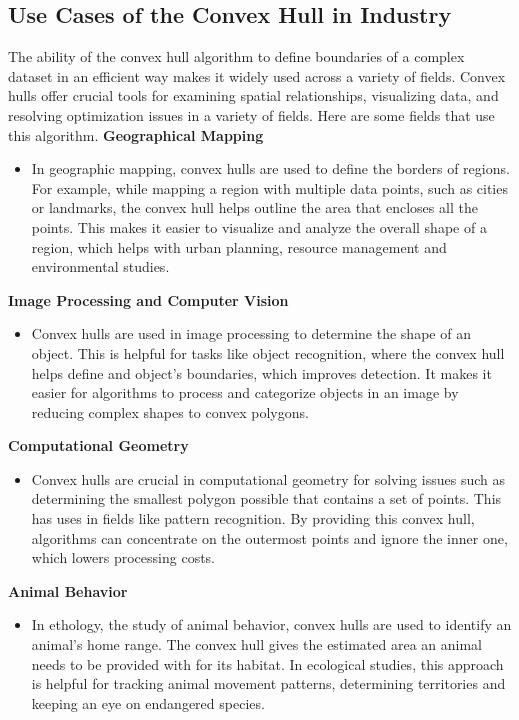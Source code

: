     \subsection{Use Cases of the Convex Hull in Industry}
    The ability of the convex hull algorithm to define boundaries of a complex dataset in an efficient way makes it widely used across a variety of fields. Convex hulls offer crucial tools for examining spatial relationships, visualizing data, and resolving optimization issues in a variety of fields. Here are some fields that use this algorithm. \newline \newline
    \textbf{Geographical Mapping}
    \begin{itemize}
        \item In geographic mapping, convex hulls are used to define the borders of regions. For example, while mapping a region with multiple data points, such as cities or landmarks, the convex hull helps outline the area that encloses all the points. This makes it easier to visualize and analyze the overall shape of a region, which helps with urban planning, resource management and environmental studies.
    \end{itemize}
    \textbf{Image Processing and Computer Vision}
    \begin{itemize}
        \item Convex hulls are used in image processing to determine the shape of an object. This is helpful for tasks like object recognition, where the convex hull helps define and object's boundaries, which improves detection. It makes it easier for algorithms to process and categorize objects in an image by reducing complex shapes to convex polygons.
    \end{itemize}
    \textbf{Computational Geometry}
    \begin{itemize}
        \item Convex hulls are crucial in computational geometry for solving issues such as determining the smallest polygon possible that contains a set of points. This has uses in fields like pattern recognition. By providing this convex hull, algorithms can concentrate on the outermost points and ignore the inner one,  which lowers processing costs.
    \end{itemize}
    \textbf{Animal Behavior}
    \begin{itemize}
        \item In ethology, the study of animal behavior, convex hulls are used to identify an animal's home range. The convex hull gives the estimated area an animal needs to be provided with for its habitat. In ecological studies, this approach is helpful for tracking animal movement patterns, determining territories and keeping an eye on endangered species.\newpage
    \end{itemize}
